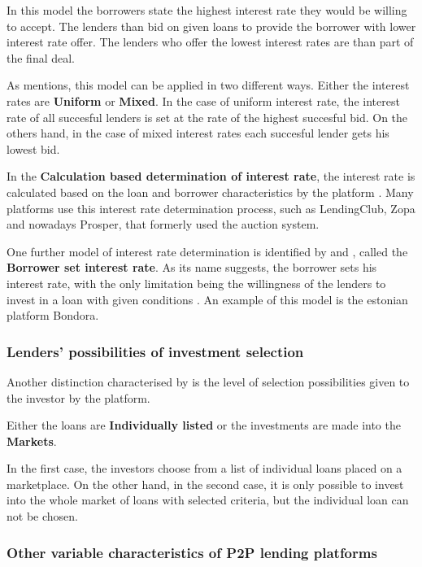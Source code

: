 In this model the borrowers state the highest interest rate they would be willing to accept. The lenders than bid on given loans to provide the borrower with lower interest rate offer. The lenders who offer the lowest interest rates are than part of the final deal. \cite[]{Bachmann2011, Vysusil2016, wiseclerk2013}

As \cite{wiseclerk2013} mentions, this model can be applied in two different ways. Either the interest rates are \textbf{Uniform} or \textbf{Mixed}. In the case of uniform interest rate, the interest rate of all succesful lenders is set at the rate of the highest succesful bid. On the others hand, in the case of mixed interest rates each succesful lender gets his lowest bid. \cite[]{wiseclerk2013}

In the \textbf{Calculation based determination of interest rate}, the interest rate is calculated based on the loan and borrower characteristics by the platform \cite[]{Bachmann2011, Vysusil2016, wiseclerk2013}. Many platforms use this interest rate determination process, such as LendingClub, Zopa and nowadays Prosper, that formerly used the auction system.

One further model of interest rate determination is identified by \cite{Vysusil2016} and \cite{wiseclerk2013} , called the \textbf{Borrower set interest rate}. As its name suggests, the borrower sets his interest rate, with the only limitation being the willingness of the lenders to invest in a loan with given conditions \cite[]{Vysusil2016, wiseclerk2013}. An example of this model is the estonian platform Bondora.

\subsubsection{Lenders' possibilities of investment selection}

Another distinction characterised by \cite{wiseclerk2013} is the level of selection possibilities given to the investor by the platform.

Either the loans are \textbf{Individually listed} or the investments are made into the \textbf{Markets}. 

In the first case, the investors choose from a list of individual loans placed on a marketplace. On the other hand, in the second case, it is only possible to invest into the whole market of loans with selected criteria, but the individual loan can not be chosen. \cite[]{wiseclerk2013}

\subsubsection{Other variable characteristics of P2P lending platforms}

